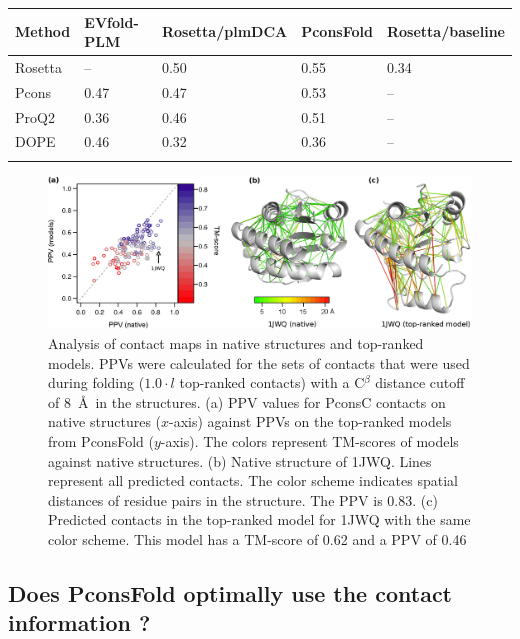 \documentclass{bioinfo}
\begin{document}
\begin{table}[!t]
{\begin{tabular}{lllll}\toprule
        Method & EVfold-PLM & Rosetta/plmDCA & PconsFold & Rosetta/baseline  \\ \midrule
        Rosetta & -- & 0.50 & 0.55 & 0.34 \\
        Pcons & 0.47 & 0.47 & 0.53 & -- \\
        ProQ2 & 0.36 & 0.46 & 0.51 & -- \\
        DOPE & 0.46 & 0.32 & 0.36 & -- \\ \botrule
\end{tabular}}{}
\end{table}

\begin{figure}[!tpb]%
\centerline{\includegraphics[scale=0.7]{figures/qa.eps}}
\caption{Analysis of contact maps in native structures and
top-ranked models. PPVs were calculated for the sets of contacts that
were used during folding ($1.0 \cdot l$ top-ranked contacts) with a
C$^\beta$ distance cutoff of 8~\AA\ in the structures. (a) PPV values for PconsC contacts on native structures 
($x$-axis) against PPVs on the top-ranked models from PconsFold 
($y$-axis). The colors represent TM-scores of models against native
structures. (b) Native structure of 1JWQ. Lines represent all predicted contacts. The color 
scheme indicates spatial distances of residue pairs in the 
structure. The PPV is 0.83. (c) Predicted contacts in the top-ranked 
model for 1JWQ with the same color scheme. This model has a TM-score 
of 0.62 and a PPV of 0.46}\label{fig:qa}
\end{figure}

\subsection{Does PconsFold optimally use the contact information ? }
\end{document}

